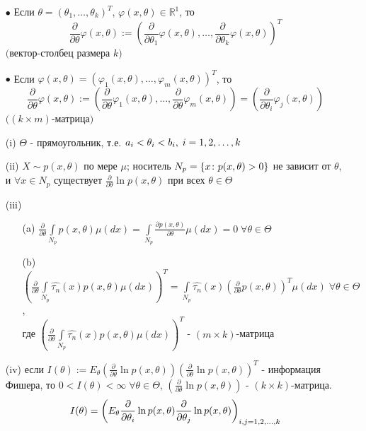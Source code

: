 \textbf{}

\begin{itemize}
	\item[$\bullet$] 
		Если $\theta = (\theta_1, \dots, \theta_k)^T$, $\varphi (x, \theta) \in \mathbb{R}^1$, то \\
		$$\displaystyle \frac{\partial}{\partial \theta} \varphi (x, \theta) := \left( \frac{\partial}{\partial \theta_1} \varphi (x, \theta), \dots, \frac{\partial}{\partial \theta_k} \varphi (x, \theta) \right)^T$$ 
		$($вектор-столбец размера $k$$)$
	\item[$\bullet$] 
		Если $\varphi (x, \theta) = (\varphi_1 (x, \theta), \dots, \varphi_m (x, \theta))^T$, то \\
		$$\displaystyle \frac{\partial}{\partial \theta} \varphi (x, \theta) := \left( \frac{\partial}{\partial \theta} \varphi_1 (x, \theta), \dots, \frac{\partial}{\partial \theta} \varphi_m (x, \theta) \right) = \left(\frac{\partial}{\partial \theta_i} \varphi_j (x, \theta)\right)$$ 
		$($$(k\times m)$-матрица$)$
\end{itemize}

\textbf{}
\begin{itemize}
	\item[(i)] $\Theta$ - прямоугольник, т.е. $a_i < \theta_i < b_i, \; i=1,2,\dots,k$
	\item[(ii)] $X \sim p(x, \theta)$ по мере $\mu$; носитель $N_p = \left\{x\colon p(x, \theta) > 0\right\}$ не зависит от $\theta$, и $\forall x \in N_p$ существует $\frac{\partial}{\partial \theta} \ln p(x, \theta)$ при всех $\theta \in \Theta$
	\item[(iii)] \begin{itemize}
		\item[(a)] $\frac{\partial}{\partial \theta} \underset{N_p}{\overset{}{\int}}p(x, \theta)\mu(dx) = \underset{N_p}{\overset{}{\int}}\frac{\partial p(x, \theta)}{\partial \theta} \mu(dx) = 0 \; \forall \theta \in \Theta$
		\item[(b)] $\left( \frac{\partial}{\partial \theta} \underset{N_p}{\overset{}{\int}} \hat{\tau_n}(x) p(x, \theta) \mu(dx) \right)^T = \underset{N_p}{\overset{}{\int}} \hat{\tau_n}(x) \left( \frac{\partial}{\partial \theta} p(x, \theta) \right)^T \mu(dx) \; \forall \theta \in \Theta$, \\
		где $\left( \frac{\partial}{\partial \theta} \underset{N_p}{\overset{}{\int}} \hat{\tau_n}(x) p(x, \theta) \mu(dx) \right)^T$ - $(m\times k)$-матрица
	\end{itemize}
	\item[(iv)] если $I(\theta) := E_{\theta} \left(\frac{\partial}{\partial \theta} \ln p(x, \theta) \right) \left(\frac{\partial}{\partial \theta} \ln p(x, \theta) \right)^T $ - информация Фишера, то $0 < I(\theta) < \infty \; \forall \theta \in \Theta$, $\left(\frac{\partial}{\partial \theta} \ln p(x, \theta) \right)$ - $(k\times k)$-матрица.
	$$I(\theta) = \left( E_{\theta} \frac{\partial}{\partial \theta_i} \ln p(x, \theta) \frac{\partial}{\partial \theta_j} \ln p(x, \theta) \right)_{i,j = 1,2,\dots,k}$$
\end{itemize}


